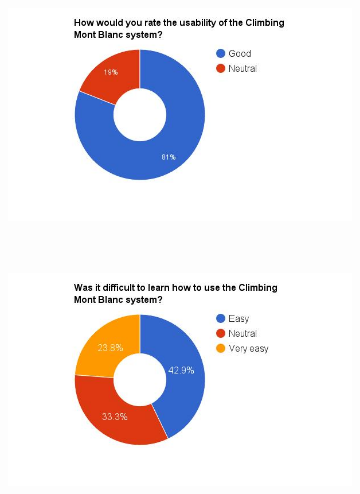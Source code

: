 \begin{figure}
    \centering
    \begin{subfigure}[h]{0.48\textwidth}
        \centerline{\includegraphics[width=1.5\textwidth]{results/usability_cmb.jpg}}
        \caption{}
        \label{fig:cmb-usability}
    \end{subfigure}
    ~ %
    \hfill
    \begin{subfigure}[h]{0.48\textwidth}
        \centerline{\includegraphics[width=1.5\textwidth]{results/learn_cmb.jpg}}
        \caption{}
        \label{fig:cmb-learn}
    \end{subfigure}


\end{figure}
